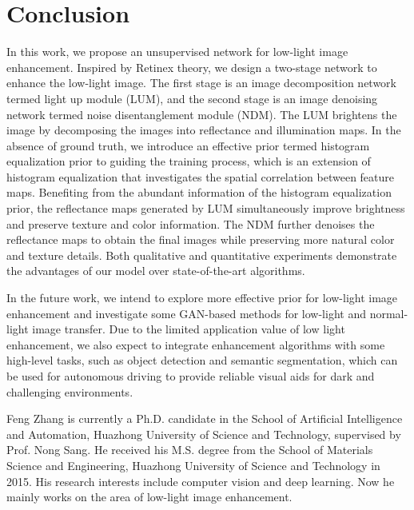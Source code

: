 \documentclass[journal]{IEEEtran}
\begin{document}
\section{Conclusion}
\label{conclusion}
In this work, we propose an unsupervised network for low-light image enhancement. Inspired by Retinex theory, we design a two-stage network to enhance the low-light image. The first stage is an image decomposition network termed light up module (LUM), and the second stage is an image denoising network termed noise disentanglement module (NDM). The LUM brightens the image by decomposing the images into reflectance and illumination maps. In the absence of ground truth, we introduce an effective prior termed histogram equalization prior to guiding the training process, which is an extension of histogram equalization that investigates the spatial correlation between feature maps. Benefiting from the abundant information of the histogram equalization prior, the reflectance maps generated by LUM simultaneously improve brightness and preserve texture and color information. The NDM further denoises the reflectance maps to obtain the final images while preserving more natural color and texture details. Both qualitative and quantitative experiments demonstrate the advantages of our model over state-of-the-art algorithms.


In the future work, we intend to explore more effective prior for low-light image enhancement and investigate some GAN-based methods for low-light and normal-light image transfer. Due to the limited application value of low light enhancement, we also expect to integrate enhancement algorithms with some high-level tasks, such as object detection and semantic segmentation, which can be used for autonomous driving to provide reliable visual aids for dark and challenging environments.



\ifCLASSOPTIONcaptionsoff
  \newpage
\fi




\begin{IEEEbiography}
{Feng Zhang}
is currently a Ph.D. candidate in the School of Artificial Intelligence and Automation, Huazhong University of Science and Technology, supervised by Prof. Nong Sang. He received his M.S. degree from the School of Materials Science and Engineering, Huazhong University of Science and Technology in 2015. His research interests include computer vision and deep learning. Now he mainly works on the area of low-light image enhancement.
\end{IEEEbiography}
\end{document}
